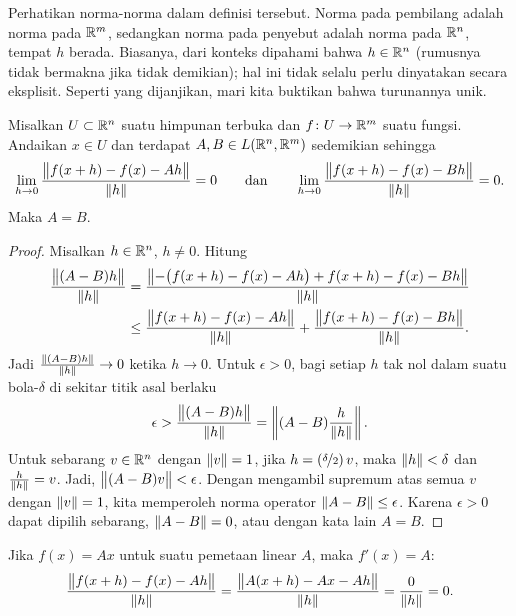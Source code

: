 Perhatikan norma-norma dalam definisi tersebut.
Norma pada
pembilang adalah norma pada ${\mathbb{R}}^m$, sedangkan norma pada penyebut adalah norma pada ${\mathbb{R}}^n$, tempat $h$
berada.
Biasanya, dari konteks dipahami bahwa $h \in {\mathbb{R}}^n$
(rumusnya tidak bermakna jika tidak demikian);
hal ini tidak selalu perlu dinyatakan secara eksplisit.
Seperti yang dijanjikan, mari kita buktikan bahwa turunannya unik.

\begin{prop}
Misalkan $U \subset {\mathbb{R}}^n$ suatu himpunan terbuka dan $f \colon U \to {\mathbb{R}}^m$ suatu fungsi.  Andaikan
$x \in U$ dan terdapat
$A,B \in L({\mathbb{R}}^n,{\mathbb{R}}^m)$ sedemikian sehingga
\begin{equation*}
\lim_{h \to 0}
\frac{\bigl\lVert {f(x+h)-f(x) - Ah} \bigr\rVert}{\lVert {h} \rVert} = 0
\qquad \text{dan} \qquad
\lim_{h \to 0}
\frac{\bigl\lVert {f(x+h)-f(x) - Bh} \bigr\rVert}{\lVert {h} \rVert} = 0 .
\end{equation*}
Maka $A=B$.
\end{prop}

\begin{proof}
Misalkan $h \in {\mathbb{R}}^n$, $h \neq 0$.  Hitung
\begin{equation*}
\begin{split}
\frac{\bigl\lVert {(A-B)h} \bigr\rVert}{\lVert {h} \rVert} & =
\frac{\bigl\lVert {-\bigl(f(x+h)-f(x) - Ah\bigr) + f(x+h)-f(x) - Bh} \bigr\rVert}{\lVert {h} \rVert} \\
& \leq
\frac{\bigl\lVert {f(x+h)-f(x) - Ah} \bigr\rVert}{\lVert {h} \rVert} + \frac{\bigl\lVert {f(x+h)-f(x) -
Bh} \bigr\rVert}{\lVert {h} \rVert} .
\end{split}
\end{equation*}
Jadi
$\frac{\lVert {(A-B)h} \rVert}{\lVert {h} \rVert} \to 0$ ketika $h \to 0$.  Untuk
$\epsilon > 0$, bagi setiap $h$ tak nol dalam suatu bola-$\delta$ di sekitar
titik asal berlaku
\begin{equation*}
\epsilon > 
\frac{\bigl\lVert {(A-B)h} \bigr\rVert}{\lVert {h} \rVert}
=
\left\lVert {(A-B)\frac{h}{\lVert {h} \rVert}} \right\rVert .
\end{equation*}
Untuk sebarang $v \in {\mathbb{R}}^n$ dengan $\lVert {v} \rVert=1$,
jika $h = (\nicefrac{\delta}{2}) \, v$, maka $\lVert {h} \rVert < \delta$
dan $\frac{h}{\lVert {h} \rVert} = v$.
Jadi, $\bigl\lVert {(A-B)v} \bigr\rVert < \epsilon$.  Dengan mengambil supremum atas semua $v$ dengan
$\lVert {v} \rVert = 1$, kita memperoleh norma operator
$\lVert {A-B} \rVert \leq \epsilon$.  Karena $\epsilon > 0$
dapat dipilih sebarang, $\lVert {A-B} \rVert = 0$, atau dengan kata lain $A = B$.
\end{proof}

\begin{example}
Jika $f(x) = Ax$ untuk suatu pemetaan linear $A$, maka
$f'(x) = A$:
\begin{equation*}
\frac{\bigl\lVert {f(x+h)-f(x) - Ah} \bigr\rVert}{\lVert {h} \rVert}
=
\frac{\bigl\lVert {A(x+h)-Ax - Ah} \bigr\rVert}{\lVert {h} \rVert}
=
\frac{0}{\lVert {h} \rVert} = 0 .
\end{equation*}
\end{example}

